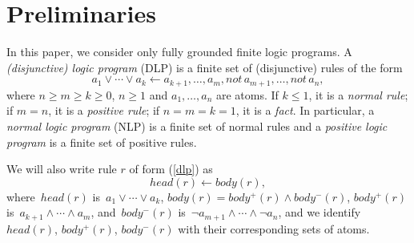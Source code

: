 \documentclass{article}
\newcommand{\Not}{not \,}
\newcommand{\Atom}{Atom\!s}
\begin{document}



\section{Preliminaries}

In this paper, we consider only fully grounded finite
logic programs. A \textit{(disjunctive) logic program} (DLP) is a finite set
of (disjunctive) rules of the form
\begin{equation}\label{dlp}
a_1\lor\cdots\lor a_k\gets a_{k+1}, \ldots, a_m, \Not  a_{m+1},
\ldots, \Not a_n,
\end{equation}
where $n\geq m \geq k \geq 0$, $n\geq 1$ and $a_1, \ldots, a_n$ are atoms. If $k \leq 1$, it is a {\em normal
rule}; if $m=n$, it is a {\em positive rule};
 if $n=m=k=1$, it is a {\em fact}. In particular, a {\em normal logic program} (NLP) is a finite set
of normal rules and a {\em positive logic program} is a finite set of positive rules.

We will also write rule $r$ of form (\ref{dlp}) as
\begin{equation}\label{dlp1}
head(r) \gets body(r),
\end{equation}
where~$head(r)$ is~$a_1\lor\cdots\lor a_k$, $body(r) = body^+(r)
\land body^-(r)$, $body^+(r)$ is~$a_{k+1}\land \cdots\land a_m$,
and~$body^-(r)$ is~$\lnot a_{m+1}\land \cdots \land\lnot a_n$, and
we identify~$head(r)$, $body^+(r)$, $body^-(r)$ with their
corresponding sets of atoms.
\end{document}
